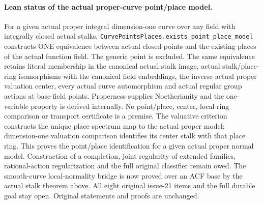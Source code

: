 \documentclass[11pt,oneside]{article}
\theoremstyle{definition}
\theoremstyle{remark}
\newcommand{\lean}[1]{\nolinkurl{#1}}
\begin{document}
\paragraph{Lean status of the actual proper-curve point/place model.}
For a given actual proper integral dimension-one curve over any field with integrally
closed actual stalks, \lean{CurvePointsPlaces.exists_point_place_model} constructs ONE
equivalence between actual closed points and the existing places of the actual function
field. The generic point is excluded. The same equivalence retains literal membership in
the canonical actual stalk image, actual stalk/place-ring isomorphisms with the canonical
field embeddings, the inverse actual proper valuation center, every actual curve
automorphism and actual regular group actions at base-field points. Properness supplies
Noetherianity and the one-variable property is derived internally. No point/place, center,
local-ring comparison or transport certificate is a premise. The valuative criterion
constructs the unique place-spectrum map to the actual proper model; dimension-one
valuation comparison identifies its center stalk with that place ring. This proves the
point/place identification for a given actual proper normal model. Construction of a
completion, joint regularity of extended families, rational-action regularization and the
full original classifier remain owed. The smooth-curve local-normality bridge is now proved
over an ACF base by the actual stalk theorem above.
All eight original issue-21 items and the full durable goal stay open. Original statements
and proofs are unchanged.
\end{document}
